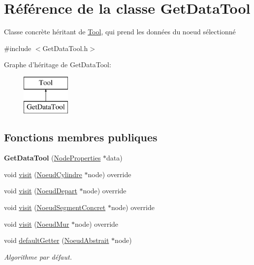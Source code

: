 \hypertarget{class_get_data_tool}{\section{Référence de la classe Get\-Data\-Tool}
\label{class_get_data_tool}
}


Classe concrète héritant de \hyperlink{class_tool}{Tool}, qui prend les données du noeud sélectionné  




{\ttfamily \#include $<$Get\-Data\-Tool.\-h$>$}

Graphe d'héritage de Get\-Data\-Tool\-:\begin{figure}[H]
\begin{center}
\leavevmode
\includegraphics[height=2.000000cm]{class_get_data_tool}
\end{center}
\end{figure}
\subsection*{Fonctions membres publiques}
\begin{DoxyCompactItemize}
\item 
\hypertarget{class_get_data_tool_a9812d5218ecf28b18dbd8ae8180e98f6}{{\bfseries Get\-Data\-Tool} (\hyperlink{struct_node_properties}{Node\-Properties} $\ast$data)}\label{class_get_data_tool_a9812d5218ecf28b18dbd8ae8180e98f6}

\item 
void \hyperlink{group__inf2990_ga21292ea905abc9e5c85d04e4ca9b6863}{visit} (\hyperlink{class_noeud_cylindre}{Noeud\-Cylindre} $\ast$node) override
\item 
void \hyperlink{group__inf2990_ga4ce08dbc70076e50ec519cd082a9e1ad}{visit} (\hyperlink{class_noeud_depart}{Noeud\-Depart} $\ast$node) override
\item 
void \hyperlink{group__inf2990_gae3edeae69aab08455d88459437c1c941}{visit} (\hyperlink{class_noeud_segment_concret}{Noeud\-Segment\-Concret} $\ast$node) override
\item 
void \hyperlink{group__inf2990_ga9db0192f32035edd1e4b8c2858feb5d1}{visit} (\hyperlink{class_noeud_mur}{Noeud\-Mur} $\ast$node) override
\item 
void \hyperlink{group__inf2990_gab96d72787632de185fd46dee5d8b9750}{default\-Getter} (\hyperlink{class_noeud_abstrait}{Noeud\-Abstrait} $\ast$node)
\begin{DoxyCompactList}\small\item\em Algorithme par défaut. \end{DoxyCompactList}\end{DoxyCompactItemize}


